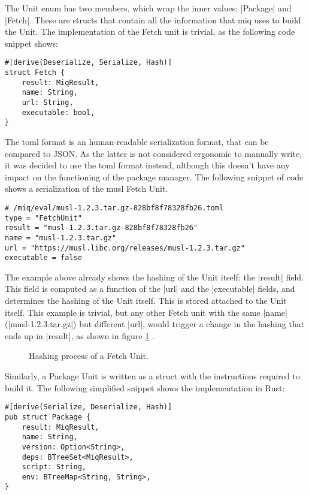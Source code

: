 The Unit enum has two members, which wrap the inner values:
|Package| and |Fetch|. These are structs that contain all
the information that miq uses to build the Unit. The
implementation of the Fetch unit is trivial, as the
following code snippet shows:

\begin{verbatim}
#[derive(Deserialize, Serialize, Hash)]
struct Fetch {
    result: MiqResult,
    name: String,
    url: String,
    executable: bool,
}
\end{verbatim}

The toml format is an human-readable serialization format,
that can be compared to JSON. As the latter is not
considered ergonomic to manually write, it was decided to
use the toml format instead, although this doesn't have any
impact on the functioning of the package manager. The
following snippet of code shows a serialization of the musl
Fetch Unit.

\begin{verbatim}
# /miq/eval/musl-1.2.3.tar.gz-828bf8f78328fb26.toml
type = "FetchUnit"
result = "musl-1.2.3.tar.gz-828bf8f78328fb26"
name = "musl-1.2.3.tar.gz"
url = "https://musl.libc.org/releases/musl-1.2.3.tar.gz"
executable = false
\end{verbatim}

The example above already shows the hashing of the Unit
itself: the |result| field. This field is computed as a
function of the |url| and the |executable| fields, and
determines the hashing of the Unit itself. This is stored
attached to the Unit itself. This example is trivial, but
any other Fetch unit with the same |name|
(|musl-1.2.3.tar.gz|) but different |url|, would trigger a
change in the hashing that ends up in |result|, as shown in
figure \ref{fig:fetch_hash} .

\begin{figure}[hbt]
    \centerfloat
    
    \caption{Hashing process of a Fetch Unit.}
    \label{fig:fetch_hash}
\end{figure}

Similarly, a Package Unit is written as a struct with the
instructions required to build it. The following simplified
snippet shows the implementation in Rust:

\begin{verbatim}
#[derive(Serialize, Deserialize, Hash)]
pub struct Package {
    result: MiqResult,
    name: String,
    version: Option<String>,
    deps: BTreeSet<MiqResult>,
    script: String,
    env: BTreeMap<String, String>,
}
\end{verbatim}

